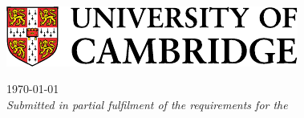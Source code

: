 \begin{sffamily}
\begin{titlepage}

\makeatletter
\begin{center}
\noindent
\huge
\@title \\
\end{center}

\begin{center}
\noindent
\huge
\@author \\
\Large
\college \\[24pt]
\includegraphics{images/logo-notext-colour.pdf}
\end{center}

\vspace{24pt}

\begin{center}
\noindent
\large
{
    \today \\
    \vspace{0.5em}
    \it Submitted in partial fulfilment of the requirements for the \\\course
}
\end{center}

\end{titlepage}
\end{sffamily}
\makeatother






